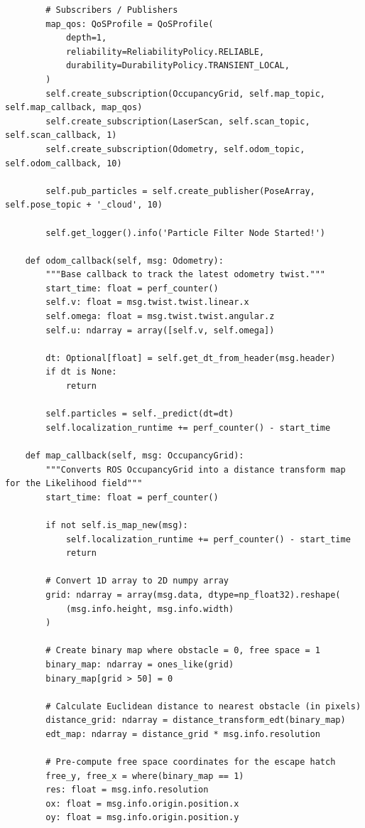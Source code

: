 \begin{verbatim}
        # Subscribers / Publishers
        map_qos: QoSProfile = QoSProfile(
            depth=1,
            reliability=ReliabilityPolicy.RELIABLE,
            durability=DurabilityPolicy.TRANSIENT_LOCAL,
        )
        self.create_subscription(OccupancyGrid, self.map_topic, self.map_callback, map_qos)
        self.create_subscription(LaserScan, self.scan_topic, self.scan_callback, 1)
        self.create_subscription(Odometry, self.odom_topic, self.odom_callback, 10)

        self.pub_particles = self.create_publisher(PoseArray, self.pose_topic + '_cloud', 10)

        self.get_logger().info('Particle Filter Node Started!')

    def odom_callback(self, msg: Odometry):
        """Base callback to track the latest odometry twist."""
        start_time: float = perf_counter()
        self.v: float = msg.twist.twist.linear.x
        self.omega: float = msg.twist.twist.angular.z
        self.u: ndarray = array([self.v, self.omega])

        dt: Optional[float] = self.get_dt_from_header(msg.header)
        if dt is None:
            return

        self.particles = self._predict(dt=dt)
        self.localization_runtime += perf_counter() - start_time

    def map_callback(self, msg: OccupancyGrid):
        """Converts ROS OccupancyGrid into a distance transform map for the Likelihood field"""
        start_time: float = perf_counter()

        if not self.is_map_new(msg):
            self.localization_runtime += perf_counter() - start_time
            return

        # Convert 1D array to 2D numpy array
        grid: ndarray = array(msg.data, dtype=np_float32).reshape(
            (msg.info.height, msg.info.width)
        )

        # Create binary map where obstacle = 0, free space = 1
        binary_map: ndarray = ones_like(grid)
        binary_map[grid > 50] = 0

        # Calculate Euclidean distance to nearest obstacle (in pixels)
        distance_grid: ndarray = distance_transform_edt(binary_map)
        edt_map: ndarray = distance_grid * msg.info.resolution

        # Pre-compute free space coordinates for the escape hatch
        free_y, free_x = where(binary_map == 1)
        res: float = msg.info.resolution
        ox: float = msg.info.origin.position.x
        oy: float = msg.info.origin.position.y


\end{verbatim}

